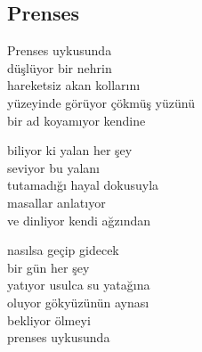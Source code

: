 \subsection{Prenses}

Prenses uykusunda \\
düşlüyor bir nehrin \\
hareketsiz akan kollarını \\
yüzeyinde görüyor çökmüş yüzünü \\
bir ad koyamıyor kendine

\noindent\newline
biliyor ki yalan her şey \\
seviyor bu yalanı \\
tutamadığı hayal dokusuyla \\
masallar anlatıyor \\
ve dinliyor kendi ağzından

\noindent\newline
nasılsa geçip gidecek \\
bir gün her şey \\
yatıyor usulca su yatağına \\
oluyor gökyüzünün aynası \\
bekliyor ölmeyi \\
prenses uykusunda
